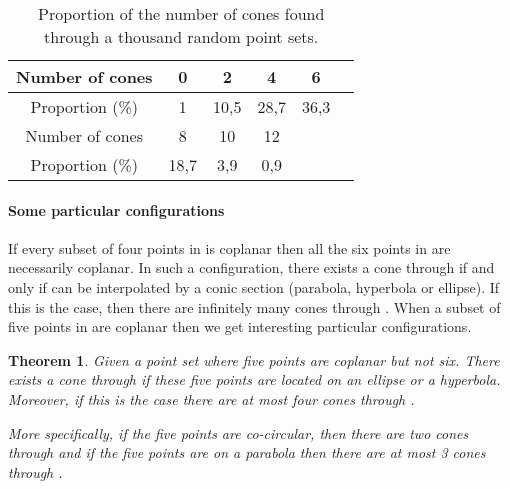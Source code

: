 \documentclass[5p]{elsarticle}
\newtheorem{thm}{Theorem}
\newcommand{\com}[1]{{\color{black} #1}}
\newcommand{\lb}[1]{{\color{black} #1}}
\begin{document}
\begin{table}
\begin{center}
\begin{tabular}{c|c|c|c|c|c|}
 Number of cones & 0 & 2 & 4 & 6  \\ 
	 \hline
Proportion (\%)	 &  1 & 10,5  & 28,7 & 36,3   \\ \hline \hline

 Number of cones  & 8 & 10 & 12 & \\ 
	 \hline
Proportion (\%)	  & 18,7 & 3,9 & 0,9 & \\

\hline	
\end{tabular}
\caption{Proportion of the number of cones found through a thousand random point sets.}\label{tab:cone6P}
\end{center}
\end{table}



\paragraph{Some particular configurations}\label{subsec:cone6P-particular}

If every subset of four \lb{po\-ints} in  is coplanar then all the six points in  are necessarily coplanar. In such a configuration, there exists a cone through  if and only if  can be interpolated by a conic section (parabola, hyperbola or ellipse). If this is the case, then there are infinitely many cones through . When a subset of five points in  are coplanar then we get interesting particular configurations.



\begin{thm}\label{them:4cones} \com{Given} a point set  where five points are coplanar but not six. \lb{There} exists a cone through  if these five points are located on \com{an ellipse or a hyperbola}. Moreover, if this is the \com{case there} are at most four cones through . 
	
	More specifically, if the five points are co-circular, then there are two cones through  and if \com{the five points} are on a parabola then there are at most 3 cones through . 
\end{thm}
\end{document}
